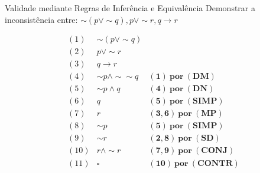 \begin{frame}[t]{Validade mediante Regras de Inferência e Equivalência}
	Demonstrar a inconsistência entre: $\sim (p \vee\sim q), p \vee\sim r, q \rightarrow r$
	
	\vskip 0.5cm
	
	$$\begin{array}{lll}
	(1) & \sim (p \vee\sim q) & \\
	(2) & p \vee\sim r & \\
	(3) & q \rightarrow r & \\
	\hline
	(4) & \sim p \wedge\sim\sim q & \mathbf{(1)~por~(DM)} \\
	(5) & \sim p \wedge q & \mathbf{(4)~por~(DN)} \\
	(6) & q & \mathbf{(5)~por~(SIMP)} \\
	(7) & r & \mathbf{(3,6)~por~(MP)} \\
	(8) & \sim p & \mathbf{(5)~por~(SIMP)} \\
	(9) & \sim r & \mathbf{(2,8)~por~(SD)} \\
	(10) & r \wedge\sim r & \mathbf{(7,9)~por~(CONJ)} \\
	(11) & \square & \mathbf{(10)~por~(CONTR)}
	\end{array}$$	
\end{frame}
